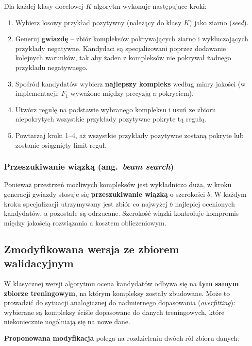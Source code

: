 \documentclass[12pt,a4paper]{article}
\begin{document}
Dla każdej klasy docelowej $K$ algorytm wykonuje następujące kroki:

\begin{enumerate}
  \item Wybierz losowy przykład pozytywny (należący do klasy $K$) jako ziarno
        (\emph{seed}).
  \item Generuj \textbf{gwiazdę} -- zbiór kompleksów pokrywających ziarno
        i wykluczających przykłady negatywne. Kandydaci są specjalizowani poprzez
        dodawanie kolejnych warunków, tak aby żaden z kompleksów nie pokrywał
        żadnego przykładu negatywnego.
  \item Spośród kandydatów wybierz \textbf{najlepszy kompleks} według miary jakości
        (w implementacji: $F_1$ wyważone między precyzją a pokryciem).
  \item Utwórz regułę na podstawie wybranego kompleksu i usuń ze zbioru niepokrytych
        wszystkie przykłady pozytywne pokryte tą regułą.
  \item Powtarzaj kroki 1--4, aż wszystkie przykłady pozytywne zostaną pokryte
        lub zostanie osiągnięty limit reguł.
\end{enumerate}

\subsubsection*{Przeszukiwanie wiązką (ang.\ \emph{beam search})}

Ponieważ przestrzeń możliwych kompleksów jest wykładniczo duża, w kroku generacji
gwiazdy stosuje się \textbf{przeszukiwanie wiązką} o szerokości $b$.
W każdym kroku specjalizacji utrzymywany jest zbiór co najwyżej $b$ najlepiej
ocenionych kandydatów, a pozostałe są odrzucane.
Szerokość wiązki kontroluje kompromis między jakością rozwiązania a kosztem
obliczeniowym.

\subsection{Zmodyfikowana wersja ze zbiorem walidacyjnym}

W klasycznej wersji algorytmu ocena kandydatów odbywa się na
\textbf{tym samym zbiorze treningowym}, na którym kompleksy zostały zbudowane.
Może to prowadzić do sytuacji analogicznej do nadmiernego dopasowania
(\emph{overfitting}): wybierane są kompleksy ściśle dopasowane do danych
treningowych, które niekoniecznie uogólniają się na nowe dane.

\medskip
\noindent\textbf{Proponowana modyfikacja} polega na rozdzieleniu dwóch ról zbioru danych:
\end{document}
